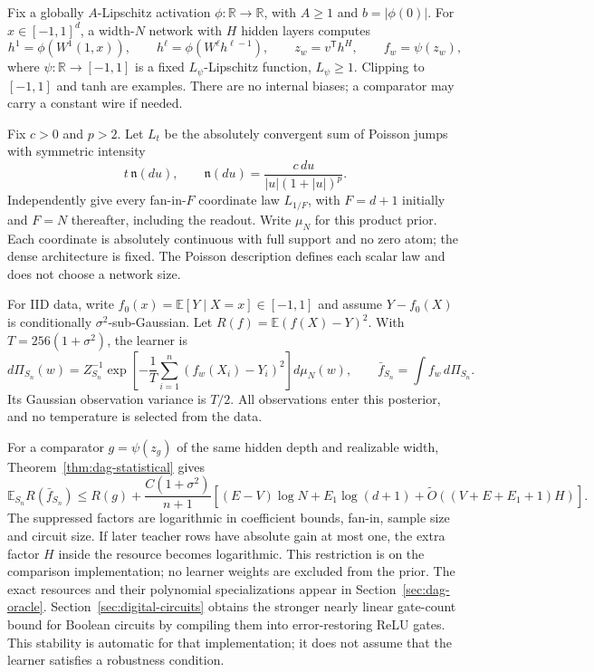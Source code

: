 \documentclass[11pt]{article}
\newcommand{\E}{\mathbb E}\newcommand{\R}{\mathbb R}\newcommand{\KL}{\operatorname{KL}}\newcommand{\Pp}{\mathbb P}
\begin{document}
Fix a globally $A$-Lipschitz activation $\phi:\R\to\R$, with $A\ge1$ and $b=|\phi(0)|$. For $x\in[-1,1]^d$, a width-$N$ network with $H$ hidden layers computes
\[
 h^1=\phi(W^1(1,x)),\qquad h^\ell=\phi(W^\ell h^{\ell-1}),
 \qquad z_w=v^{\mathsf T}h^H,\qquad f_w=\psi(z_w),
\]
where $\psi:\R\to[-1,1]$ is a fixed $L_\psi$-Lipschitz function, $L_\psi\ge1$. Clipping to $[-1,1]$ and tanh are examples. There are no internal biases; a comparator may carry a constant wire if needed.

Fix $c>0$ and $p>2$. Let $L_t$ be the absolutely convergent sum of Poisson jumps with symmetric intensity
\[
 t\,\mathfrak n(du),\qquad
 \mathfrak n(du)=\frac{c\,du}{|u|(1+|u|)^p}.
\]
Independently give every fan-in-$F$ coordinate law $L_{1/F}$, with $F=d+1$ initially and $F=N$ thereafter, including the readout. Write $\mu_N$ for this product prior. Each coordinate is absolutely continuous with full support and no zero atom; the dense architecture is fixed. The Poisson description defines each scalar law and does not choose a network size.

For IID data, write $f_0(x)=\E[Y\mid X=x]\in[-1,1]$ and assume $Y-f_0(X)$ is conditionally $\sigma^2$-sub-Gaussian. Let $R(f)=\E(f(X)-Y)^2$. With $T=256(1+\sigma^2)$, the learner is
\[
 d\Pi_{S_n}(w)=Z_{S_n}^{-1}
    \exp\left[-\frac1T\sum_{i=1}^n(f_w(X_i)-Y_i)^2\right]d\mu_N(w),
 \qquad \bar f_{S_n}=\int f_w\,d\Pi_{S_n}.
\]
Its Gaussian observation variance is $T/2$. All observations enter this posterior, and no temperature is selected from the data.

For a comparator $g=\psi(z_g)$ of the same hidden depth and realizable width, Theorem~\ref{thm:dag-statistical} gives
\[
 \E_{S_n}R(\bar f_{S_n})\le R(g)
   +\frac{C(1+\sigma^2)}{n+1}
      \left[(E-V)\log N+E_1\log(d+1)
              +\widetilde O((V+E+E_1+1)H)\right].
\]
The suppressed factors are logarithmic in coefficient bounds, fan-in, sample size and circuit size. If later teacher rows have absolute gain at most one, the extra factor $H$ inside the resource becomes logarithmic. This restriction is on the comparison implementation; no learner weights are excluded from the prior. The exact resources and their polynomial specializations appear in Section~\ref{sec:dag-oracle}. Section~\ref{sec:digital-circuits} obtains the stronger nearly linear gate-count bound for Boolean circuits by compiling them into error-restoring ReLU gates. This stability is automatic for that implementation; it does not assume that the learner satisfies a robustness condition.
\end{document}
